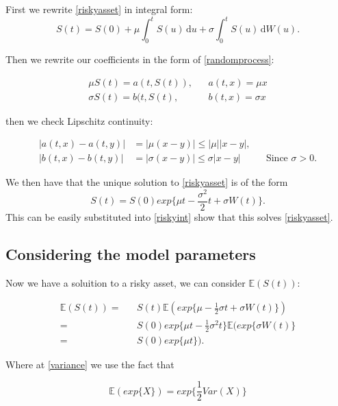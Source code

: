 \documentclass[11pt]{article} %
\begin{document}
First we rewrite \ref{riskyasset} in integral form:
\begin{equation}\label{riskyint}
    S(t) = S(0) + \mu\int_0^t \! S(u) \, \mathrm{d}u + \sigma\int_0^t \! S(u) \, 
    \mathrm{d}W(u).
\end{equation}

Then we rewrite our coefficients in the form of \ref{randomprocess}: 

\begin{align}
    \mu S(t) = a(t,S(t)), && a(t,x) = \mu x \\
    \sigma S(t) = b(t,S(t), && b(t,x) = \sigma x
\end{align}

then we check Lipschitz continuity:

\begin{align}
    |a(t,x) - a(t,y)| &= |\mu(x-y)| \leq |\mu||x-y|, \\
    |b(t,x) - b(t,y)| &= |\sigma(x-y)| \leq \sigma|x-y| &&\text{Since $\sigma > 0$.}
\end{align}

We then have that the unique solution to \ref{riskyasset} is of the form 
\begin{equation}
    S(t) = S(0)exp\{\mu t - \frac{\sigma^2}{2}t + \sigma W(t)\}.
\end{equation}
This can be easily substituted into \ref{riskyint} show that this solves \ref{riskyasset}.

\subsection{Considering the model parameters}

Now we have a soluition to a risky asset, we can consider $\mathbb{E}(S(t))$:

\begin{align}
    \mathbb{E}(S(t))  = &&S(t)\mathbb{E}(exp\{\mu - \frac{1}{2}\sigma t + \sigma W(t)\})\\
     \label{variance}= 
     && S(0)exp\{\mu t - \frac{1}{2}\sigma^2 t\}\mathbb{E}(exp\{\sigma W(t)\} \\
    \label{result} = && S(0)exp\{\mu t\}).
\end{align}

Where at \ref{variance} we use the fact that 

\begin{equation*}
    \mathbb{E}(exp\{X\}) = exp\{\frac{1}{2}Var(X)\}
\end{equation*}
\end{document}
